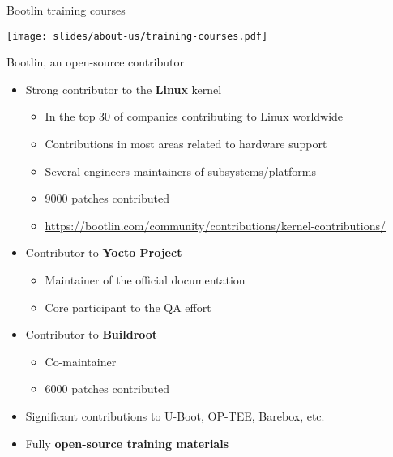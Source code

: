 \begin{frame}{Bootlin training courses}
  \begin{center}
    \texttt{[image: slides/about-us/training-courses.pdf]}
  \end{center}
\end{frame}

\begin{frame}{Bootlin, an open-source contributor}
  \begin{itemize}
  \item Strong contributor to the {\bf Linux} kernel
    \begin{itemize}
    \item In the top 30 of companies contributing to Linux worldwide
    \item Contributions in most areas related to hardware support
    \item Several engineers maintainers of subsystems/platforms
    \item 9000 patches contributed
    \item \url{https://bootlin.com/community/contributions/kernel-contributions/}
    \end{itemize}
  \item Contributor to {\bf Yocto Project}
    \begin{itemize}
    \item Maintainer of the official documentation
    \item Core participant to the QA effort
    \end{itemize}
  \item Contributor to {\bf Buildroot}
    \begin{itemize}
    \item Co-maintainer
    \item 6000 patches contributed
    \end{itemize}
  \item Significant contributions to U-Boot, OP-TEE, Barebox, etc.
  \item Fully {\bf open-source training materials}
  \end{itemize}
\end{frame}

